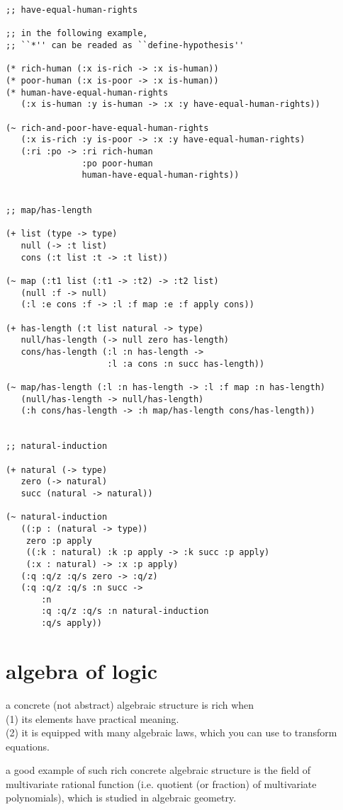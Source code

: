 \documentclass{sigplanconf}
\begin{document}
{\scriptsize\begin{verbatim}
;; have-equal-human-rights

;; in the following example,
;; ``*'' can be readed as ``define-hypothesis''

(* rich-human (:x is-rich -> :x is-human))
(* poor-human (:x is-poor -> :x is-human))
(* human-have-equal-human-rights
   (:x is-human :y is-human -> :x :y have-equal-human-rights))

(~ rich-and-poor-have-equal-human-rights
   (:x is-rich :y is-poor -> :x :y have-equal-human-rights)
   (:ri :po -> :ri rich-human
               :po poor-human
               human-have-equal-human-rights))


;; map/has-length

(+ list (type -> type)
   null (-> :t list)
   cons (:t list :t -> :t list))

(~ map (:t1 list (:t1 -> :t2) -> :t2 list)
   (null :f -> null)
   (:l :e cons :f -> :l :f map :e :f apply cons))

(+ has-length (:t list natural -> type)
   null/has-length (-> null zero has-length)
   cons/has-length (:l :n has-length ->
                    :l :a cons :n succ has-length))

(~ map/has-length (:l :n has-length -> :l :f map :n has-length)
   (null/has-length -> null/has-length)
   (:h cons/has-length -> :h map/has-length cons/has-length))


;; natural-induction

(+ natural (-> type)
   zero (-> natural)
   succ (natural -> natural))

(~ natural-induction
   ((:p : (natural -> type))
    zero :p apply
    ((:k : natural) :k :p apply -> :k succ :p apply)
    (:x : natural) -> :x :p apply)
   (:q :q/z :q/s zero -> :q/z)
   (:q :q/z :q/s :n succ ->
       :n
       :q :q/z :q/s :n natural-induction
       :q/s apply))
\end{verbatim}}

\section{algebra of logic}

a concrete (not abstract) algebraic structure is rich when \\
(1) its elements have practical meaning. \\
(2) it is equipped with many algebraic laws, which you can use to transform equations.

a good example of such rich concrete algebraic structure
is the field of multivariate rational function
(i.e. quotient (or fraction) of multivariate polynomials),
which is studied in algebraic geometry.
\end{document}
